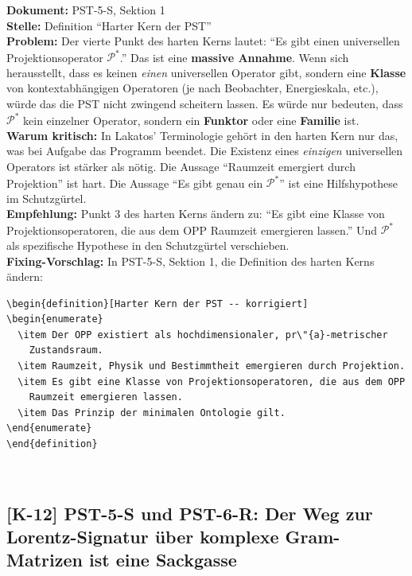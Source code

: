 \documentclass[11pt,a4paper]{article}
\newcommand{\K}[1]{\textbf{[K-#1]}}
\newcommand{\Dok}[1]{\textbf{Dokument:} #1\\}
\newcommand{\Stelle}[1]{\textbf{Stelle:} #1\\}
\newcommand{\Prob}[1]{\textbf{Problem:} #1\\}
\newcommand{\Krit}[1]{\textbf{Warum kritisch:} #1\\}
\newcommand{\Empf}[1]{\textbf{Empfehlung:} #1\\}
\newcommand{\Fix}[1]{\textbf{Fixing-Vorschlag:} #1\\}
\begin{document}
\Dok{PST-5-S, Sektion 1}
\Stelle{Definition ``Harter Kern der PST''}
\Prob{Der vierte Punkt des harten Kerns lautet: ``Es gibt einen
universellen Projektionsoperator $\mathcal{P}^*$.'' Das ist eine
\textbf{massive Annahme}. Wenn sich herausstellt, dass es keinen
\emph{einen} universellen Operator gibt, sondern eine \textbf{Klasse}
von kontextabh\"{a}ngigen Operatoren (je nach Beobachter, Energieskala,
etc.), w\"{u}rde das die PST nicht zwingend scheitern lassen. Es
w\"{u}rde nur bedeuten, dass $\mathcal{P}^*$ kein einzelner Operator,
sondern ein \textbf{Funktor} oder eine \textbf{Familie} ist.}
\Krit{In Lakatos' Terminologie geh\"{o}rt in den harten Kern nur das,
was bei Aufgabe das Programm beendet. Die Existenz eines \emph{einzigen}
universellen Operators ist st\"{a}rker als n\"{o}tig. Die Aussage
``Raumzeit emergiert durch Projektion'' ist hart. Die Aussage ``Es
gibt genau ein $\mathcal{P}^*$'' ist eine Hilfshypothese im
Schutzg\"{u}rtel.}
\Empf{Punkt 3 des harten Kerns \"{a}ndern zu: ``Es gibt eine Klasse von
Projektionsoperatoren, die aus dem OPP Raumzeit emergieren lassen.''
Und $\mathcal{P}^*$ als spezifische Hypothese in den Schutzg\"{u}rtel
verschieben.}
\Fix{In PST-5-S, Sektion 1, die Definition des harten Kerns
\"{a}ndern:
\begin{verbatim}
\begin{definition}[Harter Kern der PST -- korrigiert]
\begin{enumerate}
  \item Der OPP existiert als hochdimensionaler, pr\"{a}-metrischer
    Zustandsraum.
  \item Raumzeit, Physik und Bestimmtheit emergieren durch Projektion.
  \item Es gibt eine Klasse von Projektionsoperatoren, die aus dem OPP
    Raumzeit emergieren lassen.
  \item Das Prinzip der minimalen Ontologie gilt.
\end{enumerate}
\end{definition}
\end{verbatim}}

\subsection{\K{12} PST-5-S und PST-6-R: Der Weg zur Lorentz-Signatur \"{u}ber
komplexe Gram-Matrizen ist eine Sackgasse}
\end{document}
